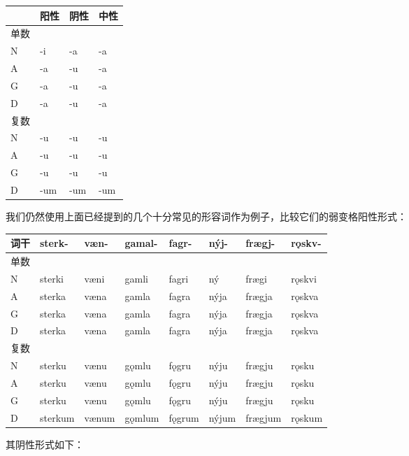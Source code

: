 \begin{longtable}{llll}
  \toprule
       & 阳性 & 阴性 & 中性 \\
  \midrule
  \endhead
  \bottomrule
  \endfoot
  单数 &      &      &      \\
  N    & -i   & -a   & -a   \\
  A    & -a   & -u   & -a   \\
  G    & -a   & -u   & -a   \\
  D    & -a   & -u   & -a   \\
  复数 &      &      &      \\
  N    & -u   & -u   & -u   \\
  A    & -u   & -u   & -u   \\
  G    & -u   & -u   & -u   \\
  D    & -um  & -um  & -um  \\
\end{longtable}

我们仍然使用上面已经提到的几个十分常见的形容词作为例子，比较它们的弱变格阳性形式：

\begin{longtable}{llllllll}
  \toprule
  词干 & sterk-  & væn-  & gamal- & fagr-  & nýj-  & frægj-  & rǫskv- \\
  \midrule
  \endhead
  \bottomrule
  \endfoot
  单数 &         &       &        &        &       &         &        \\
  N    & sterki  & væni  & gamli  & fagri  & ný    & frægi   & rǫskvi \\
  A    & sterka  & væna  & gamla  & fagra  & nýja  & frægja  & rǫskva \\
  G    & sterka  & væna  & gamla  & fagra  & nýja  & frægja  & rǫskva \\
  D    & sterka  & væna  & gamla  & fagra  & nýja  & frægja  & rǫskva \\
  复数 &         &       &        &        &       &         &        \\
  N    & sterku  & vænu  & gǫmlu  & fǫgru  & nýju  & frægju  & rǫsku  \\
  A    & sterku  & vænu  & gǫmlu  & fǫgru  & nýju  & frægju  & rǫsku  \\
  G    & sterku  & vænu  & gǫmlu  & fǫgru  & nýju  & frægju  & rǫsku  \\
  D    & sterkum & vænum & gǫmlum & fǫgrum & nýjum & frægjum & rǫskum \\
\end{longtable}

其阴性形式如下：


